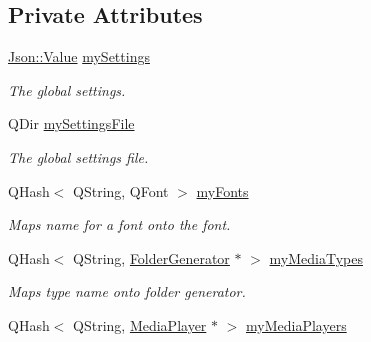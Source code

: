\subsection*{Private Attributes}
\begin{DoxyCompactItemize}
\item 
\hypertarget{class_a_w_e_1_1_global_settings_ac20041368a3097f04979bef0cb716ea4}{\hyperlink{class_json_1_1_value}{Json\-::\-Value} \hyperlink{class_a_w_e_1_1_global_settings_ac20041368a3097f04979bef0cb716ea4}{my\-Settings}}\label{class_a_w_e_1_1_global_settings_ac20041368a3097f04979bef0cb716ea4}

\begin{DoxyCompactList}\small\item\em The global settings. \end{DoxyCompactList}\item 
\hypertarget{class_a_w_e_1_1_global_settings_ad4997ad85d8ec55b6333dde7030393c8}{Q\-Dir \hyperlink{class_a_w_e_1_1_global_settings_ad4997ad85d8ec55b6333dde7030393c8}{my\-Settings\-File}}\label{class_a_w_e_1_1_global_settings_ad4997ad85d8ec55b6333dde7030393c8}

\begin{DoxyCompactList}\small\item\em The global settings file. \end{DoxyCompactList}\item 
\hypertarget{class_a_w_e_1_1_global_settings_afe252ea913daaabd7e6b9155ef1285b3}{Q\-Hash$<$ Q\-String, Q\-Font $>$ \hyperlink{class_a_w_e_1_1_global_settings_afe252ea913daaabd7e6b9155ef1285b3}{my\-Fonts}}\label{class_a_w_e_1_1_global_settings_afe252ea913daaabd7e6b9155ef1285b3}

\begin{DoxyCompactList}\small\item\em Maps name for a font onto the font. \end{DoxyCompactList}\item 
\hypertarget{class_a_w_e_1_1_global_settings_a39ee4527e136e797c7b6abf7b37837bc}{Q\-Hash$<$ Q\-String, \hyperlink{class_a_w_e_1_1_folder_generator}{Folder\-Generator} $\ast$ $>$ \hyperlink{class_a_w_e_1_1_global_settings_a39ee4527e136e797c7b6abf7b37837bc}{my\-Media\-Types}}\label{class_a_w_e_1_1_global_settings_a39ee4527e136e797c7b6abf7b37837bc}

\begin{DoxyCompactList}\small\item\em Maps type name onto folder generator. \end{DoxyCompactList}\item 
\hypertarget{class_a_w_e_1_1_global_settings_aba028e2a5f31d358de527368107a1e82}{Q\-Hash$<$ Q\-String, \hyperlink{class_a_w_e_1_1_media_player}{Media\-Player} $\ast$ $>$ \hyperlink{class_a_w_e_1_1_global_settings_aba028e2a5f31d358de527368107a1e82}{my\-Media\-Players}}\label{class_a_w_e_1_1_global_settings_aba028e2a5f31d358de527368107a1e82}


\end{DoxyCompactItemize}
